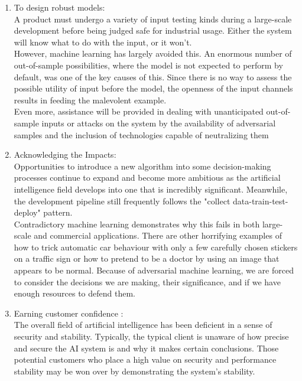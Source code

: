 \documentclass[ 12pt,a4paper,twocolumn,fleqn]{article}
\begin{document}
\begin{enumerate}
    \item To design robust models: \\
    A product must undergo a variety of input testing kinds during a large-scale development before being judged safe for industrial usage. Either the system will know what to do with the input, or it won't.\\
    However, machine learning has largely avoided this. An enormous number of out-of-sample possibilities, where the model is not expected to perform by default, was one of the key causes of this. Since there is no way to assess the possible utility of input before the model, the openness of the input channels results in feeding the malevolent example.\\
    Even more, assistance will be provided in dealing with unanticipated out-of-sample inputs or attacks on the system by the availability of adversarial samples and the inclusion of technologies capable of neutralizing them
    \item  Acknowledging the Impacts:\\
    Opportunities to introduce a new algorithm into some decision-making processes continue to expand and become more ambitious as the artificial intelligence field develops into one that is incredibly significant. Meanwhile, the development pipeline still frequently follows the "collect data-train-test-deploy" pattern.\\
    Contradictory machine learning demonstrates why this fails in both large-scale and commercial applications. There are other horrifying examples of how to trick automatic car behaviour with only a few carefully chosen stickers on a traffic sign or how to pretend to be a doctor by using an image that appears to be normal. Because of adversarial machine learning, we are forced to consider the decisions we are making, their significance, and if we have enough resources to defend them.\\
    \item Earning customer confidence :\\
    The overall field of artificial intelligence has been deficient in a sense of security and stability. Typically, the typical client is unaware of how precise and secure the AI system is and why it makes certain conclusions. Those potential customers who place a high value on security and performance stability may be won over by demonstrating the system's stability.\\

\end{enumerate}
\end{document}
